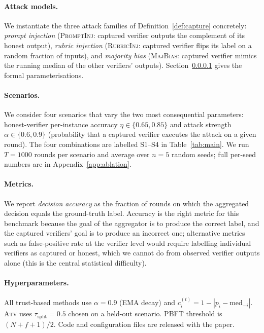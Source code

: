 \documentclass[11pt]{article}
\begin{document}
\paragraph{Attack models.}
\label{sub:attacks}
We instantiate the three attack families of
Definition~\ref{def:capture} concretely: \emph{prompt injection}
(\textsc{PromptInj}: captured verifier outputs the complement of its
honest output), \emph{rubric injection}
(\textsc{RubricInj}: captured verifier flips its label on a random
fraction of inputs), and \emph{majority bias}
(\textsc{MajBias}: captured verifier mimics the running median of the
other verifiers' outputs). Section~\ref{sub:attacks} gives the formal
parameterisations.

\paragraph{Scenarios.}
We consider four scenarios that vary the two most consequential
parameters: honest-verifier per-instance accuracy $\eta \in \{0.65,
0.85\}$ and attack strength $\alpha \in \{0.6, 0.9\}$ (probability
that a captured verifier executes the attack on a given round). The
four combinations are labelled S1--S4 in
Table~\ref{tab:main}. We run $T = 1000$ rounds per scenario and
average over $n = 5$ random seeds; full per-seed numbers are in
Appendix~\ref{app:ablation}.

\paragraph{Metrics.}
We report \emph{decision accuracy} as the fraction of rounds on which
the aggregated decision equals the ground-truth label. Accuracy is the
right metric for this benchmark because the goal of the aggregator is
to produce the correct label, and the captured verifiers' goal is to
produce an incorrect one; alternative metrics such as false-positive
rate at the verifier level would require labelling individual
verifiers as captured or honest, which we cannot do from observed
verifier outputs alone (this is the central statistical difficulty).

\paragraph{Hyperparameters.}
All trust-based methods use $\alpha = 0.9$ (EMA decay) and
$c_i^{(t)} = 1 - |p_i - \text{med}_{-i}|$. \textsc{Atv} uses
$\tau_{\text{split}} = 0.5$ chosen on a held-out scenario. PBFT
threshold is $(N+f+1)/2$. Code and configuration files are released
with the paper.
\end{document}
